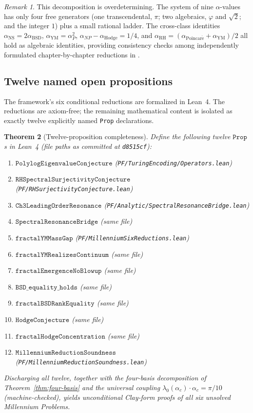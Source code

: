 \documentclass[11pt,a4paper]{article}
\newtheorem{theorem}{Theorem}[section]
\theoremstyle{definition}
\theoremstyle{remark}
\newtheorem{remark}[theorem]{Remark}
\begin{document}
\begin{remark}
This decomposition is overdetermining. The system of nine $\alpha$-values
has only four free generators (one transcendental, $\pi$; two algebraics,
$\varphi$ and $\sqrt{2}$; and the integer $1$) plus a small rational
ladder. The cross-class identities $\alpha_{\mathrm{NS}} = 2 \alpha_{\mathrm{BSD}}$,
$\alpha_{\mathrm{YM}} = \alpha_P^2$, $\alpha_{NP} - \alpha_{\mathrm{Hodge}} = 1/4$,
and $\alpha_{\mathrm{RH}} = (\alpha_{\mathrm{Poincar\acute{e}}} + \alpha_{\mathrm{YM}})/2$
all hold as algebraic identities, providing consistency checks among
independently formulated chapter-by-chapter reductions in
\cite{cohen2025framework}.
\end{remark}

\subsection{Twelve named open propositions}

The framework's six conditional reductions are formalized in Lean~4. The
reductions are axiom-free; the remaining mathematical content is isolated
as exactly twelve explicitly named \texttt{Prop} declarations.

\begin{theorem}[Twelve-proposition completeness]\label{thm:twelve-props}
Define the following twelve $\mathtt{Prop}$s in Lean~4
(file paths as committed at \texttt{d8515cf}):
\begin{enumerate}[leftmargin=2em,itemsep=1pt]
\item $\mathtt{PolylogEigenvalueConjecture}$ (\texttt{PF/TuringEncoding/Operators.lean})
\item $\mathtt{RHSpectralSurjectivityConjecture}$ (\texttt{PF/RHSurjectivityConjecture.lean})
\item $\mathtt{Ch3LeadingOrderResonance}$ (\texttt{PF/Analytic/SpectralResonanceBridge.lean})
\item $\mathtt{SpectralResonanceBridge}$ (same file)
\item $\mathtt{fractalYMMassGap}$ (\texttt{PF/MillenniumSixReductions.lean})
\item $\mathtt{fractalYMRealizesContinuum}$ (same file)
\item $\mathtt{fractalEmergenceNoBlowup}$ (same file)
\item $\mathtt{BSD\_equality\_holds}$ (same file)
\item $\mathtt{fractalBSDRankEquality}$ (same file)
\item $\mathtt{HodgeConjecture}$ (same file)
\item $\mathtt{fractalHodgeConcentration}$ (same file)
\item $\mathtt{MillenniumReductionSoundness}$ (\texttt{PF/MillenniumReductionSoundness.lean})
\end{enumerate}
Discharging all twelve, together with the four-basis decomposition of
Theorem~\ref{thm:four-basis} and the universal coupling
$\lambda_0(\alpha_c) \cdot \alpha_c = \pi/10$ (machine-checked),
yields unconditional Clay-form proofs of all six unsolved Millennium
Problems.
\end{theorem}
\end{document}

